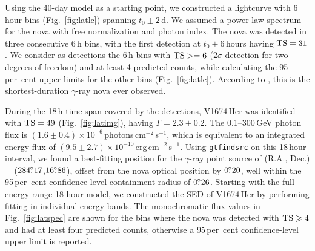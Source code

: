 \documentclass[a4paper,fleqn,usenatbib]{mnras}
\newcommand{\nova}{V1674\,Her}
\begin{document}
Using the 40-day model as a starting point, we constructed a lightcurve with 6\,hour bins (Fig.~\ref{fig:latlc}) spanning $t_0 \pm 2$\,d.
We assumed a power-law spectrum for the nova with free normalization and photon index.
The nova was detected in three consecutive 6\,h bins, with the first detection at $t_0+6$\,hours having ${\rm TS}=31$.
We consider as detections the 6\,h bins with ${\rm TS}>=6$ ($2\sigma$ detection for two degrees of freedom) 
and at least 4 predicted counts, while calculating the 95\,per~cent upper limits for the other bins (Fig.~\ref{fig:latlc}).
According to \cite{2022MNRAS.517L..97L}, this is the shortest-duration $\gamma$-ray nova ever observed.

During the 18\,h time span covered by the detections, \nova{} was identified with ${\rm TS} = 49$ (Fig.~\ref{fig:latimg}), having 
$\Gamma = 2.3 \pm 0.2$. %
The 0.1--300\,GeV photon flux is $(1.6 \pm 0.4) \times 10^{-6}$\,photons\,cm$^{-2}$\,s$^{-1}$, which is equivalent 
to an integrated energy flux of $(9.5 \pm 2.7) \times 10^{-10}$\,erg\,cm$^{-2}$\,s$^{-1}$.
%
%
%
%
Using \texttt{gtfindsrc} on this 18\,hour interval, we found a best-fitting position for the
$\gamma$-ray point source of 
(R.A., Dec.) = ($284\fdg17$,$16\fdg86$), 
offset from the nova optical position by $0\fdg20$, 
well within the 95\,per~cent confidence-level containment radius of $0\fdg26$.
Starting with the full-energy range 18-hour model, we constructed the SED of \nova{} 
by performing fitting in individual energy bands. The monochromatic flux values in Fig.~\ref{fig:latspec}
are shown for the bins where the nova was detected with ${\rm TS}\geq4$ and had at least four predicted counts, 
otherwise a 95\,per~cent confidence-level upper limit is reported.
\end{document}
